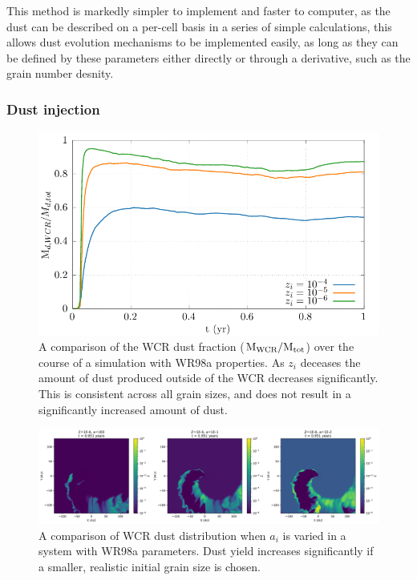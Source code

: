 \noindent
This method is markedly simpler to implement and faster  to computer, as the dust can be described on a per-cell basis in a series of simple calculations, this allows dust evolution mechanisms to be implemented easily, as long as they can be defined by these parameters either directly or through a derivative, such as the grain number desnity.

\subsubsection{Dust injection}
\label{sec:injection}

\begin{figure}[ht]
  \centering
  \includegraphics{assets/a_z_tweaking/wcrratio.pdf}
  \caption[WCR dust fraction testing comparison]{A comparison of the WCR dust fraction ($\text{M}_\text{WCR}/\text{M}_\text{tot}$) over the course of a simulation with WR98a properties. As $z_i$ deceases the amount of dust produced outside of the WCR decreases significantly. This is consistent across all grain sizes, and does not result in a significantly increased amount of dust.}
  \label{fig:aztwek_wcrrat}
\end{figure}

\begin{figure}[ht]
  \centering
  \includegraphics[width=\linewidth]{assets/a_z_tweaking/zconcat.png}
  \caption[$z_i$ testing]{A comparison of WCR dust distribution when $a_i$ is varied in a system with WR98a parameters. Dust yield increases significantly if a smaller, realistic initial grain size is chosen.}
  \label{fig:azweak_img}
\end{figure}

